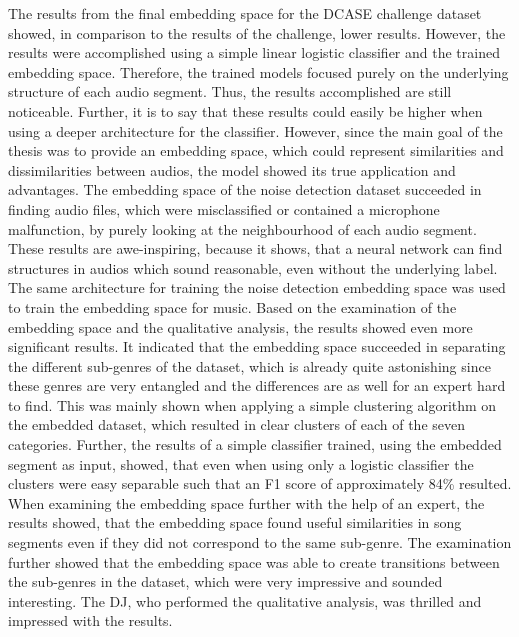 The results from the final embedding space for the \gls{DCASE} challenge dataset showed, in comparison to the results of the challenge, lower results. However, the results were accomplished using a simple linear logistic classifier and the trained embedding space. Therefore, the trained models focused purely on the underlying structure of each audio segment. Thus, the results accomplished are still noticeable. Further, it is to say that these results could easily be higher when using a deeper architecture for the classifier. However, since the main goal of the thesis was to provide an embedding space, which could represent similarities and dissimilarities between audios, the model showed its true application and advantages. The embedding space of the noise detection dataset succeeded in finding audio files, which were misclassified or contained a microphone malfunction, by purely looking at the neighbourhood of each audio segment. These results are awe-inspiring, because it shows, that a neural network can find structures in audios which sound reasonable, even without the underlying label.
\newline
\newline
The same architecture for training the noise detection embedding space was used to train the embedding space for music. Based on the examination of the embedding space and the qualitative analysis, the results showed even more significant results. It indicated that the embedding space succeeded in separating the different sub-genres of the dataset, which is already quite astonishing since these genres are very entangled and the differences are as well for an expert hard to find. This was mainly shown when applying a simple clustering algorithm on the embedded dataset, which resulted in clear clusters of each of the seven categories. Further, the results of a simple classifier trained, using the embedded segment as input, showed, that even when using only a logistic classifier the clusters were easy separable such that an F1 score of approximately 84\% resulted. When examining the embedding space further with the help of an expert, the results showed, that the embedding space found useful similarities in song segments even if they did not correspond to the same sub-genre. The examination further showed that the embedding space was able to create transitions between the sub-genres in the dataset, which were very impressive and sounded interesting. The DJ, who performed the qualitative analysis, was thrilled and impressed with the results.
\newline
